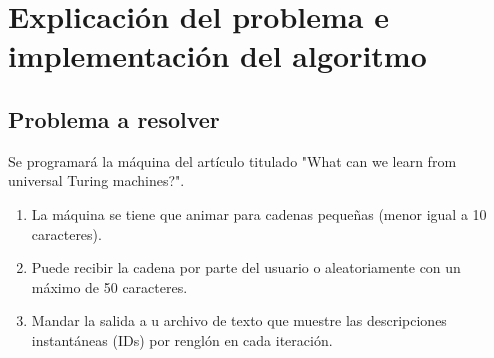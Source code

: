 \documentclass{article}
\begin{document}
\section{Explicaci\'on del problema e implementaci\'on del algoritmo}
\subsection{Problema a resolver}
Se programará la máquina del artículo titulado "What can we learn from universal Turing machines?".
\begin{enumerate}
    \item La máquina se tiene que animar para cadenas pequeñas (menor igual a 10 caracteres).
    \item Puede recibir la cadena por parte del usuario o aleatoriamente con un máximo de 50 caracteres.
    \item Mandar la salida a u archivo de texto que muestre las descripciones instantáneas (IDs) por renglón en cada iteración.
\end{enumerate}
\end{document}
